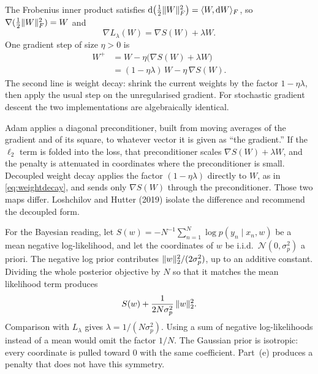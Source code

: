 
The Frobenius inner product satisfies \(\mathrm{d}\bigl(\tfrac12\lVert W\rVert_F^2\bigr) = \langle W, \mathrm{d} W\rangle_F\), so \(\nabla(\tfrac12\lVert W\rVert_F^2) = W\) and
\[
  \nabla L_\lambda(W) = \nabla S(W) + \lambda W.
\]
One gradient step of size \(\eta>0\) is
\begin{align}
  W^{+}
  &= W - \eta\bigl(\nabla S(W)+\lambda W\bigr) \nonumber\\
  &= (1-\eta\lambda)\,W - \eta\,\nabla S(W).
  \label{eq:weightdecay}
\end{align}
The second line is weight decay: shrink the current weights by the factor \(1-\eta\lambda\), then apply the usual step on the unregularised gradient. For stochastic gradient descent the two implementations are algebraically identical.

Adam applies a diagonal preconditioner, built from moving averages of the gradient and of its square, to whatever vector it is given as ``the gradient.'' If the \(\ell_2\) term is folded into the loss, that preconditioner scales \(\nabla S(W)+\lambda W\), and the penalty is attenuated in coordinates where the preconditioner is small. Decoupled weight decay applies the factor \((1-\eta\lambda)\) directly to \(W\), as in \eqref{eq:weightdecay}, and sends only \(\nabla S(W)\) through the preconditioner. Those two maps differ. Loshchilov and Hutter (2019) isolate the difference and recommend the decoupled form.

For the Bayesian reading, let \(S(w) = -N^{-1}\sum_{n=1}^N \log p(y_n\mid x_n,w)\) be a mean negative log-likelihood, and let the coordinates of \(w\) be i.i.d.\ \(\mathcal N(0,\sigma_p^2)\) a priori. The negative log prior contributes \(\lVert w\rVert_2^2/(2\sigma_p^2)\), up to an additive constant. Dividing the whole posterior objective by \(N\) so that it matches the mean likelihood term produces
\[
  S(w) + \frac{1}{2N\sigma_p^2}\,\lVert w\rVert_2^2.
\]
Comparison with \(L_\lambda\) gives \(\lambda = 1/(N\sigma_p^2)\). Using a sum of negative log-likelihoods instead of a mean would omit the factor \(1/N\). The Gaussian prior is isotropic: every coordinate is pulled toward \(0\) with the same coefficient. Part~(e) produces a penalty that does not have this symmetry.

